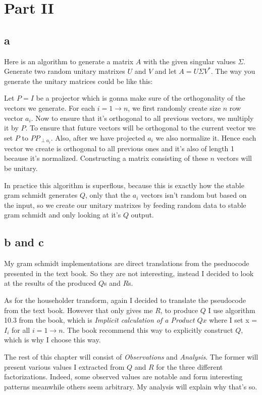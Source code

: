 \documentclass[a4paper,11pt]{article}
\begin{document}
\section{Part II}

\subsection{a}

Here is an algorithm to generate a matrix $A$ with the given singular values
$\Sigma$. Generate two random unitary matrixes $U$ and $V$ and let $A = U
\Sigma V^*$. The way you generate the unitary matrices could be like this:

Let $P=I$ be a projector which is gonna make sure of the orthogonality of the
vectors we generate. For each $i=1 \to n$, we first randomly create size $n$
row vector $a_i$. Now to ensure that it's orthogonal to all previous vectors,
we multiply it by $P$. To ensure that future vectors will be orthogonal to the
current vector we set $P$ to $P P_{\perp a_i}$. Also, after we have projected
$a_i$ we also normalize it. Hence each vector we create is orthogonal to all
previous ones and it's also of length 1 because it's normalized. Constructing
a matrix consisting of these $n$ vectors will be unitary.

In practice this algorithm is superflous, because this is exactly
how the stable gram schmidt generates $Q$, only that the $a_i$ vectors isn't
random but based on the input, so we create our unitary matrixes by feeding
random data to stable gram schmidt and only looking at it's $Q$ output.

\subsection{b and c}

My gram schmidt implementations are direct translations from the
pseduocode presented in the text book. So they are not interesting,
instead I decided to look at the results of the produced $Q$s and $R$s.

As for the householder transform, again I decided to translate the
pseudocode from the text book. However that only gives me $R$, to
produce $Q$ I use algorithm 10.3 from the book, which is
\emph{Implicit calculation of a Product $Qx$} where I set x = $I_i$ for
all $i = 1 \to n$. The book recommend this way to explicitly construct
$Q$, which is why I choose this way.

The rest of this chapter will consist of \emph{Observations} and
\emph{Analysis}. The former will present various values I extracted from
$Q$ and $R$ for the three different factorizations. Indeed, some
observed values are notable and form interesting patterns meanwhile
others seem arbitrary. My analysis will explain why that's so.
\end{document}
